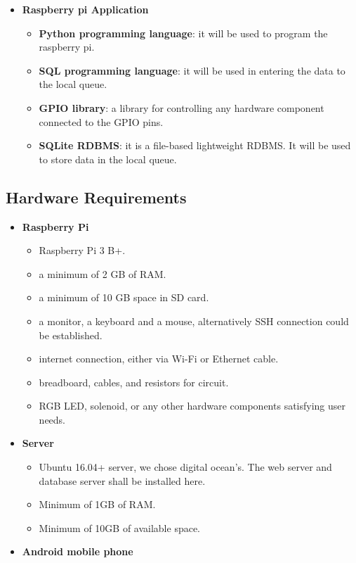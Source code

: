 \documentclass[12pt, oneside, a4paper]{book}
\newcommand\boldcolor[1]{\textcolor{bold}{\textbf{#1}}}
\begin{document}
\begin{itemize}
				\item \boldcolor{Raspberry pi Application}
				\begin{itemize}
					\item \textbf{Python programming language}: it will be used to program the raspberry pi.
					\item \textbf{SQL programming language}: it will be used in entering the data to the local queue.
					\item \textbf{GPIO library}: a library for controlling any hardware component connected to the GPIO pins\cite{gpio}.
					\item \textbf{SQLite RDBMS}: it is a file-based lightweight RDBMS\cite{sqlite}. It will be used to store data in the local queue.
				\end{itemize}

			\end{itemize}
			\newpage\subsection{Hardware Requirements}
			\label{sec:hardware_req}
				\begin{itemize}
					\item \boldcolor{Raspberry Pi} 
					\begin{itemize}
						\item Raspberry Pi 3 B+.
						\item a minimum of 2 GB of RAM.
						\item a minimum of 10 GB space in SD card.
						\item a monitor, a keyboard and a mouse, alternatively SSH connection could be established.
						\item internet connection, either via Wi-Fi or Ethernet cable.
						\item breadboard, cables, and resistors for circuit.
						\item RGB LED, solenoid, or any other hardware components satisfying user needs.
					\end{itemize}
					\item \boldcolor{Server} 
					\begin{itemize}
						\item Ubuntu 16.04+ server, we chose digital ocean's. The web server and database server shall be installed here.
						\item Minimum of 1GB of RAM.
						\item Minimum of 10GB of available space.
					\end{itemize}
					\item \boldcolor{Android mobile phone} 
				\end{itemize}
\end{document}
